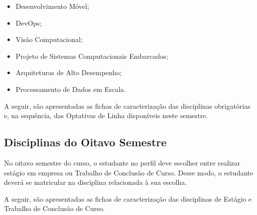     \begin{itemize}
        \item Desenvolvimento Móvel;
        \item DevOps;
        \item Visão Computacional;
        \item Projeto de Sistemas Computacionais Embarcados;
        \item Arquiteturas de Alto Desempenho;
        \item Processamento de Dados em Escala.
    \end{itemize}
    
    A seguir, são apresentadas as fichas de caracterização das disciplinas obrigatórias e, na sequência, das Optativas de Linha disponíveis neste semestre.
    
    
    
    
    
    
    
    
    
    
    
    
    
    
    
    
    
    
    \subsection{Disciplinas do Oitavo Semestre}
    
    
    No oitavo semestre do curso, o estudante no perfil deve escolher entre realizar estágio em empresa ou Trabalho de Conclusão de Curso. Desse modo, o estudante deverá se matricular na disciplina relacionada à sua escolha. 
    
    A seguir, são apresentadas as fichas de caracterização das disciplinas de Estágio e Trabalho de Conclusão de Curso.
    
    
    
